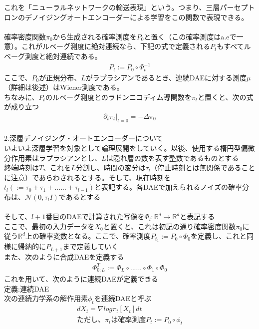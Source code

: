 \documentclass{jsarticle}
\begin{document}
これを「ニューラルネットワークの輸送表現」という。つまり、三層パーセプトロンのデノイジングオートエンコーダーによる学習をこの関数で表現できる。\\
　\\
確率密度関数$\pi_0$から生成される確率測度を$P_0$と置く（この確率測度はa.eで一意）。これがルベーグ測度に絶対連続なら、下記の式で定義される$P_t$もすべてルベーグ測度と絶対連続である。
\begin{eqnarray}
P_t:=P_0\circ\Phi_t^{-1}
\end{eqnarray}
ここで、$P_0$が正規分布、$L$がラプラシアンであるとき、連続DAEに対する測度$\mu$（詳細は後述）はWiener測度である。\\
ちなみに、$P_t$のルベーグ測度とのラドンニコディム導関数を$\pi_t$と置くと、次の式が成り立つ
\begin{eqnarray}
\partial_t \pi_t|_{t=0}=-\Delta \pi_0
\end{eqnarray}
　\\
2.深層デノイジング・オートエンコーダーについて\\
いよいよ深層学習を対象として論理展開をしていく。以後、使用する楕円型偏微分作用素はラプラシアンとし、$L$は隠れ層の数を表す整数であるものとする\\
終端時刻は$T$、これを$L$分割し、時間の変分は$\tau_l$（停止時刻とは無関係であることに注意）であらわされるとする。そして、現在時刻を$t_l(:=\tau_0+\tau_1+......+\tau_{l-1})$と表記する。各DAEで加えられるノイズの確率分布は、$\mathcal{N}(0,\tau_lI)$であるとする\\
　\\
そして、$l+1$番目のDAEで計算された写像を$\Phi_l:\mathbb{R}^d\rightarrow\mathbb{R}^d$と表記する\\
ここで、最初の入力データを$X_0$と置くと、これは初記の通り確率密度関数$\pi_0$に従う$\mathbb{R}^d$上の確率変数となる。ここで、確率測度$P_{t_1}:=P_0\circ\Phi_0$を定義し、これと同様に帰納的に$P_{L+1}$まで定義していく\\
また、次のように合成DAEを定義する
\begin{eqnarray}
\Phi^T_{0;L}:=\Phi_L\circ......\circ\Phi_1\circ\Phi_0
\end{eqnarray}
これを用いて、次のように連続DAEが定義できる\\
定義:連続DAE\\
次の連続力学系の解作用素$\phi_t$を連続DAEと呼ぶ
\begin{eqnarray}
dX_t=\nabla log\pi_t[X_t]dt\\
ただし、\pi_tは確率測度P_t:=P_0\circ\phi_t\nonumber
\end{eqnarray}
\end{document}
